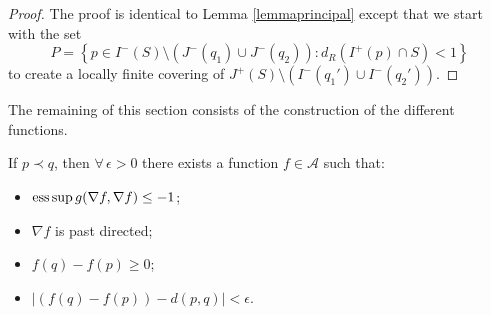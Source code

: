 \documentclass[pdftex]{sigma}
\newcommand{\abs}[1]{\left\vert {#1} \right\vert}
\newcommand{\set}[1]{\left\{ {#1} \right\}}
\newcommand{\parenthese}[1]{\left( {#1} \right)}
\begin{document}
\begin{proof}
The proof is identical to Lemma \ref{lemmaprincipal} except that we start with the set \[
P = \set{ p \in I^-(S) \setminus \parenthese{J^-(q_1) \cup J^-(q_2)} : d_R(I^+(p) \cap S) < 1}
\]
to create a locally f\/inite covering of $J^+(S) \setminus \parenthese{ I^-(q_1') \cup I^-(q_2') }$.
\end{proof}

The remaining of this section consists of the construction of the dif\/ferent functions.

\begin{lemma}\label{equality}
If $p \prec q$, then $\forall\, \epsilon > 0$ there exists a function $f\in \mathcal A$ such that:
\begin{itemize}
\item $\text{\rm ess} \sup g( \nabla f, \nabla f ) \leq -1$;
\item $\nabla f$ is past directed;
\item $f(q)-f(p) \geq 0$;
\item $\abs{(f(q)-f(p)) - d(p,q)} < \epsilon$.
\end{itemize}

\end{lemma}
\end{document}
